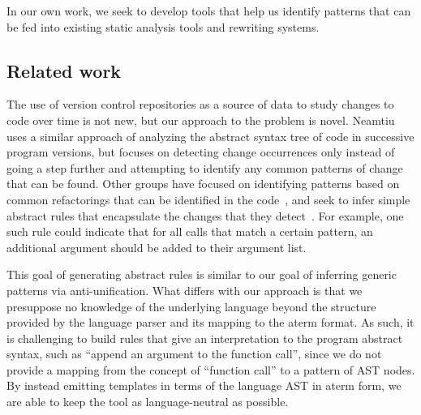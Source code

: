 
In our own work, we seek to develop tools that help us identify patterns that
can be fed into existing static analysis tools and rewriting systems.

\subsection{Related work}

The use of version control repositories as a source of data to study changes
to code over time is not new, but our approach to the problem is novel.
Neamtiu~\cite{neamtiu05understand} uses a similar approach of analyzing the
abstract syntax tree of code in successive program versions, but focuses on
detecting change occurrences only instead of going a step further and
attempting to identify any common patterns of change that can be found.  
Other groups have focused on identifying patterns based on common
refactorings that can be identified in the code~\cite{weissgerber06identify},
and seek to infer simple abstract rules that encapsulate the changes
that they detect~\cite{kim07automatic}.  For example, one such rule could
indicate that for all calls that match a certain pattern, an additional
argument should be added to their argument list.

This goal of generating abstract rules is similar to our goal of inferring
generic patterns via anti-unification.  What differs with our approach is
that we presuppose no knowledge of the underlying language beyond the structure
provided by the language parser and its mapping to the aterm format.  As such,
it is challenging to build rules that give an interpretation to the program
abstract syntax, such as ``append an argument to the function call'', since
we do not provide a mapping from the concept of ``function call'' to a pattern
of AST nodes.  By instead emitting templates in terms of the language AST in
aterm form, we are able to keep the tool as language-neutral as possible.
